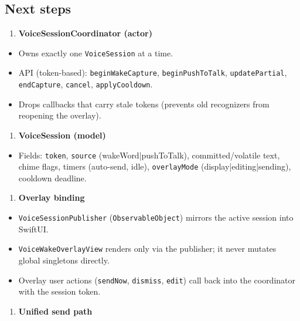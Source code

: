 \subsection{Next steps}


\begin{enumerate}
  \item \textbf{VoiceSessionCoordinator (actor)}
\end{enumerate}

\begin{itemize}
  \item Owns exactly one \texttt{VoiceSession} at a time.
  \item API (token-based): \texttt{beginWakeCapture}, \texttt{beginPushToTalk}, \texttt{updatePartial}, \texttt{endCapture}, \texttt{cancel}, \texttt{applyCooldown}.
  \item Drops callbacks that carry stale tokens (prevents old recognizers from reopening the overlay).
\end{itemize}

\begin{enumerate}
  \item \textbf{VoiceSession (model)}
\end{enumerate}

\begin{itemize}
  \item Fields: \texttt{token}, \texttt{source} (wakeWord|pushToTalk), committed/volatile text, chime flags, timers (auto-send, idle), \texttt{overlayMode} (display|editing|sending), cooldown deadline.
\end{itemize}

\begin{enumerate}
  \item \textbf{Overlay binding}
\end{enumerate}

\begin{itemize}
  \item \texttt{VoiceSessionPublisher} (\texttt{ObservableObject}) mirrors the active session into SwiftUI.
  \item \texttt{VoiceWakeOverlayView} renders only via the publisher; it never mutates global singletons directly.
  \item Overlay user actions (\texttt{sendNow}, \texttt{dismiss}, \texttt{edit}) call back into the coordinator with the session token.
\end{itemize}

\begin{enumerate}
  \item \textbf{Unified send path}
\end{enumerate}

